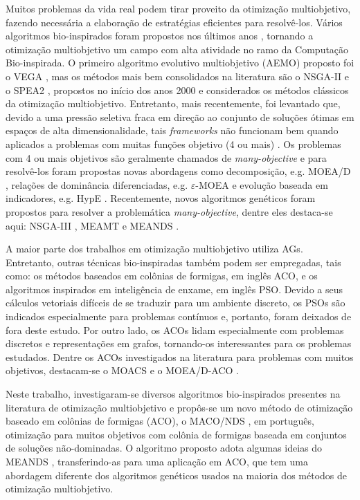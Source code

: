 Muitos problemas da vida real podem tirar proveito da otimização multiobjetivo, fazendo necessária a elaboração de estratégias eficientes para resolvê-los. Vários algoritmos bio-inspirados foram propostos nos últimos anos \cite{Deb2002,Zitzler2002,Deb2014}, tornando a otimização multiobjetivo um campo com alta atividade no ramo da Computação Bio-inspirada. O primeiro algoritmo evolutivo multiobjetivo (AEMO) proposto foi o \ac{VEGA} \cite{Schaffer1985}, mas os métodos mais bem consolidados na literatura são o NSGA-II \cite{Deb2002} e o SPEA2 \cite{Zitzler2002}, propostos no início dos anos 2000 e considerados os métodos clássicos da otimização multiobjetivo. Entretanto, mais recentemente, foi levantado que, devido a uma pressão seletiva fraca em direção ao conjunto de soluções ótimas em espaços de alta dimensionalidade, tais \textit{frameworks} não funcionam bem quando aplicados a problemas com muitas funções objetivo (4 ou mais) \cite{Deb2014}. Os problemas com 4 ou mais objetivos são geralmente chamados de \textit{many-objective} e para resolvê-los foram propostas novas abordagens como decomposição, e.g. MOEA/D \cite{Zhang2007}, relações de dominância diferenciadas, e.g. $\varepsilon$-MOEA \cite{Aguirre2009} e evolução baseada em indicadores, e.g. HypE \cite{Bader2011}. Recentemente, novos algoritmos genéticos foram propostos para resolver a problemática \textit{many-objective}, dentre eles destaca-se aqui: NSGA-III \cite{Deb2014}, MEAMT \cite{Brasil2013} e MEANDS \cite{Lafeta2017}.

A maior parte dos trabalhos em otimização multiobjetivo utiliza \acp{AG}. Entretanto, outras técnicas bio-inspiradas também podem ser empregadas, tais como: os métodos baseados em colônias de formigas, em inglês \ac{ACO}, e os algoritmos inspirados em inteligência de enxame, em inglês \ac{PSO}. Devido a seus cálculos vetoriais difíceis de se traduzir para um ambiente discreto, os \acp{PSO} são indicados especialmente para problemas contínuos e, portanto, foram deixados de fora deste estudo. Por outro lado, os \acp{ACO} lidam especialmente com problemas discretos e representações em grafos, tornando-os interessantes para os problemas estudados. Dentre os ACOs investigados na literatura para problemas com muitos objetivos, destacam-se o MOACS \cite{Baran2003} e o MOEA/D-ACO \cite{Ke2013}.

Neste trabalho, investigaram-se diversos algoritmos bio-inspirados presentes na literatura de otimização multiobjetivo e propôs-se um novo método de otimização baseado em colônias de formigas (ACO), o \ac{MACO/NDS} \cite{Franca2018}, em português, otimização para muitos objetivos com colônia de formigas baseada em conjuntos de soluções não-dominadas. O algoritmo proposto adota algumas ideias do MEANDS \cite{Lafeta2017}, transferindo-as para uma aplicação em ACO, que tem uma abordagem diferente dos algoritmos genéticos usados na maioria dos métodos de otimização multiobjetivo.

